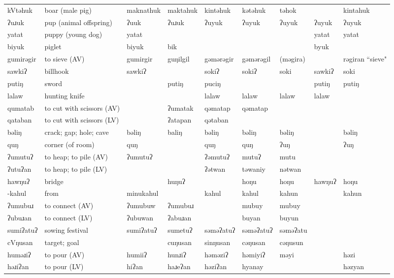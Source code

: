 \begin{landscape}
\begin{longtable}{*{9}{>{\raggedright\arraybackslash}p{}}}
\text{*}kVtəhuk & boar (male pig) & maknathuk & maktahuk & kintəhuk & kətəhuk & təhok &  & kintahuk\\
\text{*}ʔuɹuk & pup (animal offspring) & ʔuuk & ʔuɹuk & ʔuyuk & ʔuyuk & ʔuyuk & ʔuyuk & ʔuyuk\\
\text{*}yatat & puppy (young dog) & yatat &  &  &  &  & yatat & yatat\\
\text{*}biyuk & piglet & biyuk & bik &  &  &  & byuk & \\
\text{*}gumirəgir & to sieve (AV) & gumirgir & guŋilgil & gəmərəgir & gəmərəgil & (məgira) &  & rəgiran ``sieve"\\
\text{*}sawkiʔ & billhook & sawkiʔ &  & sokiʔ & sokiʔ & soki & sawkiʔ & soki\\
\text{*}putiŋ & sword &  & putiŋ & puciŋ &  &  & putiŋ & putiŋ\\
\text{*}lalaw & hunting knife &  &  & lalaw & lalaw & lalaw & lalaw & \\
\text{*}qumatab & to cut with scissors (AV) &  & ʔumatak & qəmatap & qəmatap &  &  & \\
\text{*}qataban & to cut with scissors (LV) &  & ʔatapan & qətaban &  &  &  & \\
\text{*}bəliŋ & crack; gap; hole; cave & bəliŋ & baliŋ & bəliŋ & bəliŋ & bəliŋ &  & bəliŋ\\
\text{*}quŋ & corner (of room) & quŋ &  & quŋ & quŋ & ʔuŋ &  & ʔuŋ\\
\text{*}ʔumutuʔ & to heap; to pile (AV) & ʔumutuʔ &  & ʔəmutuʔ & mutuʔ & mutu &  & \\
\text{*}ʔutuʔan & to heap; to pile (LV) &  &  & ʔətwan & təwaniy & nətwan &  & \\
\text{*}hawŋuʔ & bridge &  & huŋuʔ &  & hoŋu & hoŋu & hawŋuʔ & hoŋu\\
\text{*}-kahul & from & minukahul &  & kahul & kahul & kahun &  & kahun\\
\text{*}ʔumubuɹ & to connect (AV) & ʔumubuw & ʔumubuɹ &  & mubuy & mubuy &  & \\
\text{*}ʔubuɹan & to connect (LV) & ʔubuwan & ʔabuɹan &  & buyan & buyun &  & \\
\text{*}sumiʔatuʔ & sowing festival & sumiʔatuʔ & sumetuʔ & səməʔatuʔ & səməʔatuʔ & səməʔatu &  & \\
\text{*}cVŋusan & target; goal &  & cuŋusan & sinŋusan & cəŋusan & cəŋusun &  & \\
\text{*}huməɹiʔ & to pour (AV) & humiiʔ & hunɹiʔ & həməziʔ & həmiyiʔ & məyi &  & həzi\\
\text{*}həɹiʔan & to pour (LV) & hiʔan & haɹeʔan & həziʔan & hyanay &  &  & həzyan\\

\end{longtable}
\end{landscape}
